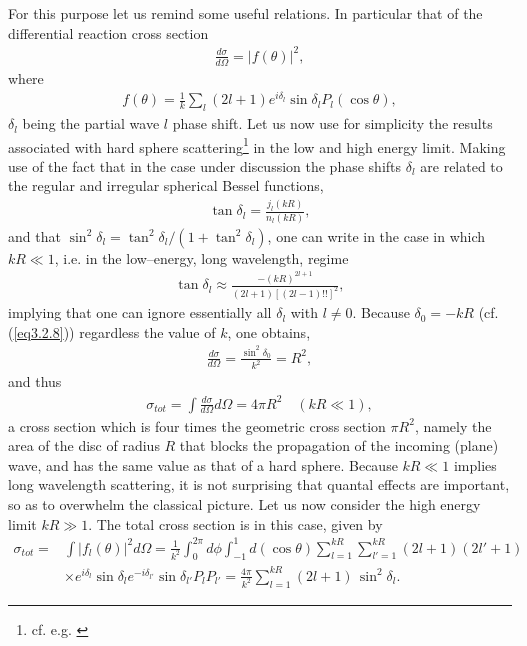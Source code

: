 For this purpose let us remind some useful relations. In particular that of the differential reaction cross section 
\begin{align}
\frac{d\sigma}{d\Omega}=|f(\theta)|^2,
\end{align}
where
\begin{align}
f(\theta)=\frac{1}{k}\sum_l(2l+1)e^{i\delta_l}\sin\delta_lP_l(\cos\theta),
\end{align}
$\delta_l$ being the partial wave $l$ phase shift. Let us now use for simplicity the results associated with hard sphere scattering\footnote{cf. e.g. \cite{Sakurai:94}} in the low and high energy limit. Making use of the fact that in the case under discussion the phase shifts $\delta_l$ are related to the regular and irregular spherical Bessel functions,
\begin{align}\label{eq3.2.8}
\tan\delta_l=\frac{j_l(kR)}{n_l(kR)},
\end{align}
and that $\sin^2\delta_l=\tan^2\delta_l/(1+\tan^2\delta_l)$,  one can write in the case in which $kR\ll1$, i.e. in the low--energy, long wavelength, regime
\begin{align}
\tan\delta_l\approx\frac{-(kR)^{2l+1}}{(2l+1)[(2l-1)!!]^2},
\end{align}
implying that one can ignore essentially all $\delta_l$ with $l\neq0$. Because $\delta_0=-kR$ (cf. (\ref{eq3.2.8})) regardless the value of $k$, one obtains,
\begin{align}
\frac{d\sigma}{d\Omega}=\frac{\sin^2\delta_0}{k^2}=R^2,
\end{align}
and thus
\begin{align}
\sigma_{tot}=\int\frac{d\sigma}{d\Omega}d\Omega=4\pi R^2\quad(kR\ll1),
\end{align}
a cross section which is four times the geometric cross section $\pi R^2$, namely the area of the disc of radius $R$ that blocks the propagation of the incoming (plane) wave, and has the same value as that of a hard sphere. Because $kR\ll1$  
implies long wavelength scattering, it is not surprising that quantal effects are important, so as to overwhelm the classical picture. Let us now consider the high energy limit $kR\gg 1$. The total cross section is in this case, given by
\begin{align}\label{eq3.2.6}
\nonumber\sigma_{tot}=&\int |f_l(\theta)|^2d\Omega=\frac{1}{k^2}\int_0^{2\pi}d\phi\int_{-1}^{1}d(\cos\theta)\sum_{l=1}^{kR}\sum_{l'=1}^{kR}(2l+1)(2l'+1)\\
&\times e^{i\delta_l}\sin\delta_l e^{-i\delta_{l'}}\sin\delta_{l'}P_lP_{l'}=\frac{4\pi}{k^2}\sum_{l=1}^{kR}(2l+1)\,\sin^2\delta_l.
\end{align}
